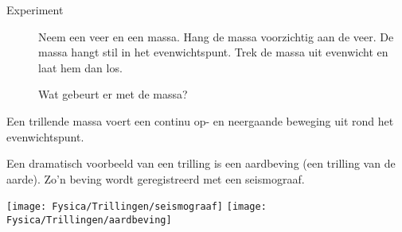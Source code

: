 \documentclass{ximera}
\begin{document}
    \author{Ingmar Herreman}
    \date{Januari 2024}

    
    \begin{description} 
        \item[Experiment] Neem een veer en een massa. Hang de massa voorzichtig aan de veer. De massa hangt stil in het evenwichtspunt. 
        Trek de massa uit evenwicht en laat hem dan los. 
        \begin{center}
        \end{center}
        Wat gebeurt er met de massa?

    \end{description}
    
\begin{definition}
    Een trillende massa voert een continu op- en neergaande beweging uit rond het evenwichtspunt.
\end{definition}

\begin{example} 
Een dramatisch voorbeeld van een trilling is een aardbeving (een trilling van de aarde). Zo’n beving wordt geregistreerd met een seismograaf.

\begin{image}[\textwidth]
        \texttt{[image: Fysica/Trillingen/seismograaf]}
        \texttt{[image: Fysica/Trillingen/aardbeving]}
\end{image}
\end{example}
 
\end{document}
